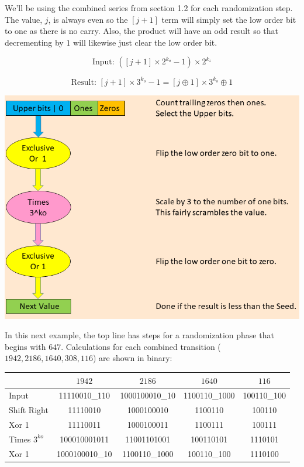 \documentclass[letterpaper]{article}
\begin{document}
\begin{multicols}{2}
We'll be using the combined series from section 1.2 for each randomization step. The value, $j$, is always even so the $[j + 1]$ term will simply set the low order bit to one as there is no carry. Also, the product will have an odd result so that decrementing by $1$ will likewise just clear the low order bit.

\[
\text{Input: } ([j + 1] \times 2^{k_o} - 1) \times 2^{k_z}
\]

\[
\text{Result: } [j + 1] \times 3^{k_o} - 1 = [j \oplus 1] \times 3^{k_o} \oplus 1
\]



\begin{center}
\includegraphics[width=\textwidth]{collatz_even}
\end{center}

In this next example, the top line has steps for a randomization phase that begins with $647$. Calculations for each combined transition ($1942, 2186, 1640, 308, 116$) are shown in binary:

\begin{table}
\centering
\begin{tabular}{|l|c|c|c|c|}
\hline
& \textbf{$1942$} & \textbf{$2186$} & \textbf{$1640$} & \textbf{$116$} \\ 
\hline
Input&11110010\_110&1000100010\_10&1100110\_1000&100110\_100 \\ 
\hline
Shift Right&11110010&1000100010&1100110&100110 \\ 
\hline
Xor 1&11110011&1000100011&1100111&100111 \\ 
\hline
Times $3^{ko}$&100010001011&11001101001&100110101&1110101 \\ 
\hline
Xor 1&1000100010\_10&1100110\_1000&100110\_100&1110100 \\ 
\hline
\end{tabular}
\end{table}


\end{multicols}
\end{document}
